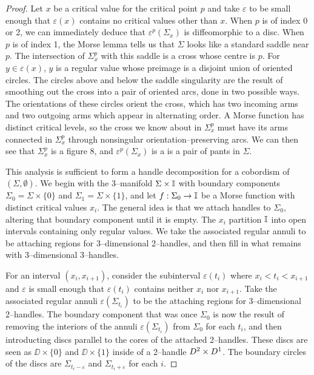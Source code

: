 \begin{proof}
	Let $x$ be a critical value for the critical point $p$ and take $\varepsilon$ to be small enough that $\varepsilon(x)$ contains no critical values other than $x$.
	When $p$ is of index 0 or 2, we can immediately deduce that $\varepsilon^p(\Sigma_x)$ is diffeomorphic to a disc.
	When $p$ is of index 1, the Morse lemma tells us that $\Sigma$ looks like a standard saddle near $p$.
	The intersection of $\Sigma_x^p$ with this saddle is a cross whose centre is $p$.
	For $y\in\varepsilon(x)$, $y$ is a regular value whose preimage is a disjoint union of oriented circles.
	The circles above and below the saddle singularity are the result of smoothing out the cross into a pair of oriented arcs, done in two possible ways.
	The orientations of these circles orient the cross, which has two incoming arms and two outgoing arms which appear in alternating order.
	A Morse function has distinct critical levels, so the cross we know about in $\Sigma_x^p$ must have its arms connected in $\Sigma_x^p$ through nonsingular orientation--preserving arcs.
	We can then see that $\Sigma_x^p$ is a figure 8, and $\varepsilon^p(\Sigma_x)$ is a is a pair of pants in $\Sigma$.
	
	This analysis is sufficient to form a handle decomposition for a cobordism of $(\Sigma,\emptyset)$.
	We begin with the 3--manifold $\Sigma\times\mathbb{I}$ with boundary components $\Sigma_0=\Sigma\times\{0\}$ and $\Sigma_1=\Sigma\times\{1\}$, and let $f:\Sigma_0\to\mathbb{I}$ be a Morse function with distinct critical values $x_i$.
	The general idea is that we attach handles to $\Sigma_0$, altering that boundary component until it is empty.
	The $x_i$ partition $\mathbb{I}$ into open intervals containing only regular values.
	We take the associated regular annuli to be attaching regions for 3--dimensional 2--handles, and then fill in what remains with 3--dimensional 3--handles.
	
	For an interval $(x_i,x_{i+1})$, consider the subinterval $\varepsilon(t_i)$ where $x_i<t_i<x_{i+1}$ and $\varepsilon$ is small enough that $\varepsilon(t_i)$ contains neither $x_i$ nor $x_{i+1}$.
	Take the associated regular annuli $\varepsilon(\Sigma_{t_i})$ to be the attaching regions for 3--dimensional 2--handles.
	The boundary component that was once $\Sigma_0$ is now the result of removing the interiors of the annuli $\varepsilon(\Sigma_{t_i})$ from $\Sigma_0$ for each $t_i$, and then introducting discs parallel to the cores of the attached 2--handles.
	These discs are seen as $\DD\times\{0\}$ and $\DD\times\{1\}$ inside of a 2--handle $D^2\times D^1$.
	The boundary circles of the discs are $\Sigma_{t_i-\varepsilon}$ and $\Sigma_{t_i+\varepsilon}$ for each $i$.
	

\end{proof}
